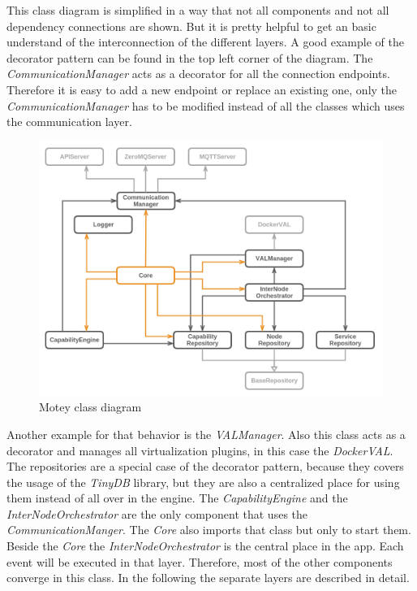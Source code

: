 This class diagram is simplified in a way that not all components and not all dependency connections are shown.
But it is pretty helpful to get an basic understand of the interconnection of the different layers.
A good example of the decorator pattern can be found in the top left corner of the diagram.
The \textit{CommunicationManager} acts as a decorator for all the connection endpoints.
Therefore it is easy to add a new endpoint or replace an existing one, only the \textit{CommunicationManager} has to be modified instead of all the classes which uses the communication layer.

\begin{figure}[H]
    \centering
    \includegraphics[width=\textwidth]{resources/images/class_diagram.png}
    \caption[Motey class diagram]{Motey class diagram}
    \label{fig:motey_class_diagram}
\end{figure}

Another example for that behavior is the \textit{VALManager}.
Also this class acts as a decorator and manages all virtualization plugins, in this case the \textit{DockerVAL}.
The repositories are a special case of the decorator pattern, because they covers the usage of the \textit{TinyDB} library, but they are also a centralized place for using them instead of all over in the engine.
The \textit{CapabilityEngine} and the \textit{InterNodeOrchestrator} are the only component that uses the \textit{CommunicationManger}.
The \textit{Core} also imports that class but only to start them.
Beside the \textit{Core} the \textit{InterNodeOrchestrator} is the central place in the app.
Each event will be executed in that layer.
Therefore, most of the other components converge in this class.
In the following the separate layers are described in detail.


